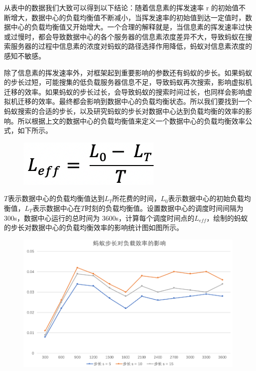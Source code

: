 从表中的数据我们大致可以得到以下结论：随着信息素的挥发速率 r 的初始值不断增大，数据中心的负载均衡值不断减小，当挥发速率的初始值到达一定值时，数据中心的负载均衡值又开始增大。一个合理的解释就是，当信息素的挥发速率过快或过慢时，都会导致数据中心的各个服务器的信息素浓度差异不大，导致蚂蚁在搜索服务器的过程中信息素的浓度对蚂蚁的路径选择作用降低，蚂蚁对信息素浓度的感知不敏感。

除了信息素的挥发速率外，对框架起到重要影响的参数还有蚂蚁的步长。如果蚂蚁的步长过短，可能搜集的低负载服务器信息不足，导致蚂蚁再次搜索，影响虚拟机迁移的效率。如果蚂蚁的步长过长，会导致蚂蚁的搜索时间过长，也同样会影响虚拟机迁移的效率。最终都会影响到数据中心的负载均衡状态。所以我们要找到一个蚂蚁搜索的合适的步长，以及研究蚂蚁的步长对数据中心达到负载均衡的效率的影响。所以根据上文的数据中心的负载均衡值来定义一个数据中心的负载均衡效率公式，如下所示。

\begin{figure}[htbp]
  \centering
  \includegraphics[width=0.3\linewidth]{./Figure/IMG_Chap4_6.png}
\end{figure}

$ T $表示数据中心的负载均衡值达到$ L_T $所花费的时间，$ L_0 $表示数据中心的初始负载均衡值，$ L_T $表示数据中心在$ T $时刻的负载均衡值。设置数据中心的调度时间间隔为 300s，数据中心运行的总时间为 3600s，计算每个调度时间点的$ L_{eff} $，绘制的蚂蚁的步长对数据中心的负载均衡效率的影响统计图如图所示。

\begin{figure}[htbp]
  \centering
  \includegraphics{./Figure/IMG_Chap4_7.png}
\end{figure}

